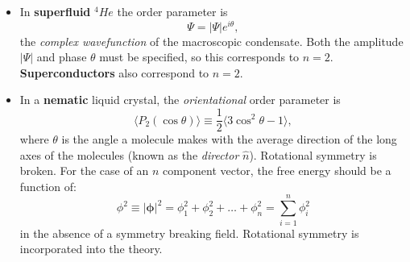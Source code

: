 \documentclass[
  letterpaper,
  enabledeprecatedfontcommands]{report}
\begin{document}
\begin{tcolorbox}
\begin{itemize}
\item
  In \textbf{superfluid} \(^4He\) the order parameter is \[
  \Psi = |\Psi| e^{i\theta},
  \] the \emph{complex wavefunction} of the macroscopic condensate. Both
  the amplitude \(|\Psi|\) and phase \(\theta\) must be specified, so
  this corresponds to \(n = 2\).\\
  \textbf{Superconductors} also correspond to \(n = 2\).
\item
  In a \textbf{nematic} liquid crystal, the \emph{orientational} order
  parameter is \[
  \langle P_2(\cos \theta) \rangle \equiv \frac{1}{2}\langle 3\cos^2 \theta - 1\rangle,
  \] where \(\theta\) is the angle a molecule makes with the average
  direction of the long axes of the molecules (known as the
  \emph{director} \(\hat{n}\)). Rotational symmetry is broken. For the
  case of an \(n\) component vector, the free energy should be a
  function of: \[
  \phi^2 \equiv |\boldsymbol{\phi}|^2 = \phi_1^2 + \phi_2^2 + \dots + \phi_n^2 = \sum_{i=1}^n \phi_i^2
  \] in the absence of a symmetry breaking field. Rotational symmetry is
  incorporated into the theory.
\end{itemize}

\begin{figure}[H]

\begin{minipage}{0.50\linewidth}




\end{minipage}
\end{figure}
\end{tcolorbox}
\end{document}
